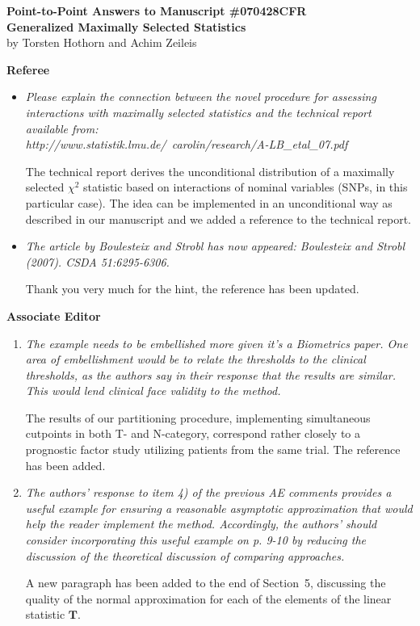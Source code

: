 \documentclass[11pt,a4paper]{article}
\begin{document}


\begin{center}
\textbf{\large Point-to-Point Answers to Manuscript \#070428CFR \\
Generalized Maximally Selected Statistics} \\
by Torsten Hothorn and Achim Zeileis
\end{center}

\vspace*{1cm}

\textbf{\large Referee}

\begin{itemize}

  \item \textit{Please explain the connection between the novel procedure
for assessing interactions with maximally selected statistics and
the technical report available from: \\
http://www.statistik.lmu.de/~carolin/research/A-LB\_etal\_07.pdf}

The technical report derives the unconditional distribution of
a maximally selected $\chi^2$ statistic based on interactions
of nominal variables (SNPs, in this particular case). The idea 
can be implemented in an unconditional way as described in 
our manuscript and we added a reference to the technical report.

\item \textit{The article by Boulesteix and Strobl has now appeared:
Boulesteix and Strobl (2007). CSDA 51:6295-6306.}

Thank you very much for the hint, the reference has been updated.

\end{itemize}

\textbf{\large Associate Editor}

\begin{enumerate}

  \item \textit{The example needs to be embellished more given it's a Biometrics paper. One area of
embellishment would be to relate the thresholds to the clinical thresholds, as the authors
say in their response that the results are similar. This would lend clinical face validity
to the method.}

The results of our partitioning procedure, implementing simultaneous cutpoints 
in both T- and N-category, correspond rather closely to a prognostic factor study 
utilizing patients from the same trial. The reference has been added.

\item \textit{The authors’ response to item 4) of the previous AE comments provides a useful
example for ensuring a reasonable asymptotic approximation that would help the reader
implement the method. Accordingly, the authors’ should consider incorporating this
useful example on p. 9-10 by reducing the discussion of the theoretical discussion of
comparing approaches.}

A new paragraph has been added to the end of Section~5, discussing the
quality of the normal approximation for each of the elements of the
linear statistic $\mathbf{T}$.

\end{enumerate}
\end{document}
